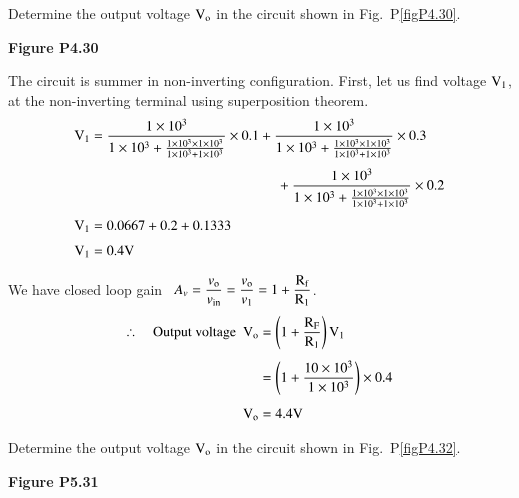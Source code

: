 \begin{problem}\label{prob4.31}
Determine the output voltage $\textrm{V}_{\textrm{o}}$ in the circuit shown in Fig.~P\ref{figP4.30}.
\begin{center}
{\bf Figure P4.30}
\end{center}
\end{problem}

\begin{solution}
The circuit is summer in non-inverting configuration. First, let us find voltage $\textrm{V}_{1}$, at the non-inverting terminal using superposition theorem.
\begin{align*}
\rmV_{1} &= \frac{1\times 10^{3}}{1\times 10^{3}+\frac{1\times 10^{3}\times 1\times 10^{3}}{1\times 10^{3}+1\times 10^{3}}}\times 0.1+\frac{1\times 10^{3}}{1\times 10^{3}+\frac{1\times 10^{3}\times 1\times 10^{3}}{1\times 10^{3}+1\times 10^{3}}}\times 0.3\\[4pt]
&\hspace{4.7cm} +\dfrac{1\times 10^{3}}{1\times 10^{3}+\frac{1\times 10^{3}\times 1\times 10^{3}}{1\times 10^{3}+1\times 10^{3}}}\times 0.2\\[4pt]
\rmV_{1} &= 0.0667+0.2+0.1333\\[3pt]
\rmV_{1} &= 0.4\rmV
\end{align*}

We have closed loop gain \ $A_{v}=\dfrac{v_{\textrm{o}}}{v_{\text{in}}}=\dfrac{v_{\textrm{o}}}{v_{1}}=1+\dfrac{\textrm{R}_{\textrm{f}}}{\textrm{R}_{1}}$.
\begin{align*}
\therefore\quad \text{Output voltage~ } \textrm{V}_{\textrm{o}} &= \left(1+\dfrac{\textrm{R}_{\textrm{F}}}{\textrm{R}_{1}}\right)\textrm{V}_{1}\\[4pt]
&= \left(1+\dfrac{10\times 10^{3}}{1\times 10^{3}}\right)\times 0.4\\[4pt]
\textrm{V}_{\textrm{o}} &= 4.4\textrm{V}
\end{align*}
\end{solution}

\begin{problem}\label{prob4.32}
Determine the output voltage $\textrm{V}_{\textrm{o}}$ in the circuit shown in Fig.~P\ref{figP4.32}.
\begin{center}
{\bf Figure P5.31}
\end{center}
\end{problem}

